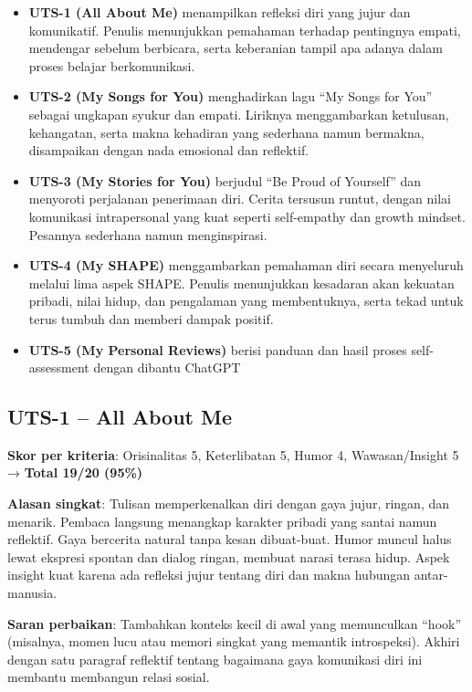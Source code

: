 \documentclass[
  letterpaper,
  DIV=11,
  numbers=noendperiod]{scrreprt}
\providecommand{\tightlist}{%
  \setlength{\itemsep}{0pt}\setlength{\parskip}{0pt}}
\begin{document}
\begin{itemize}
\tightlist
\item
  \textbf{UTS-1 (All About Me)} menampilkan refleksi diri yang jujur dan
  komunikatif. Penulis menunjukkan pemahaman terhadap pentingnya empati,
  mendengar sebelum berbicara, serta keberanian tampil apa adanya dalam
  proses belajar berkomunikasi.
\item
  \textbf{UTS-2 (My Songs for You)} menghadirkan lagu ``My Songs for
  You'' sebagai ungkapan syukur dan empati. Liriknya menggambarkan
  ketulusan, kehangatan, serta makna kehadiran yang sederhana namun
  bermakna, disampaikan dengan nada emosional dan reflektif.
\item
  \textbf{UTS-3 (My Stories for You)} berjudul ``Be Proud of Yourself''
  dan menyoroti perjalanan penerimaan diri. Cerita tersusun runtut,
  dengan nilai komunikasi intrapersonal yang kuat seperti self-empathy
  dan growth mindset. Pesannya sederhana namun menginspirasi.
\item
  \textbf{UTS-4 (My SHAPE)} menggambarkan pemahaman diri secara
  menyeluruh melalui lima aspek SHAPE. Penulis menunjukkan kesadaran
  akan kekuatan pribadi, nilai hidup, dan pengalaman yang membentuknya,
  serta tekad untuk terus tumbuh dan memberi dampak positif.
\item
  \textbf{UTS-5 (My Personal Reviews)} berisi panduan dan hasil proses
  self-assessment dengan dibantu ChatGPT
\end{itemize}

\subsection{UTS-1 -- All About Me}\label{uts-1-all-about-me-1}

\textbf{Skor per kriteria}: Orisinalitas 5, Keterlibatan 5, Humor 4,
Wawasan/Insight 5 → \textbf{Total 19/20 (95\%)}

\textbf{Alasan singkat}: Tulisan memperkenalkan diri dengan gaya jujur,
ringan, dan menarik. Pembaca langsung menangkap karakter pribadi yang
santai namun reflektif. Gaya bercerita natural tanpa kesan dibuat-buat.
Humor muncul halus lewat ekspresi spontan dan dialog ringan, membuat
narasi terasa hidup. Aspek insight kuat karena ada refleksi jujur
tentang diri dan makna hubungan antar-manusia.

\textbf{Saran perbaikan}: Tambahkan konteks kecil di awal yang
memunculkan ``hook'' (misalnya, momen lucu atau memori singkat yang
memantik introspeksi). Akhiri dengan satu paragraf reflektif tentang
bagaimana gaya komunikasi diri ini membantu membangun relasi sosial.
\end{document}

